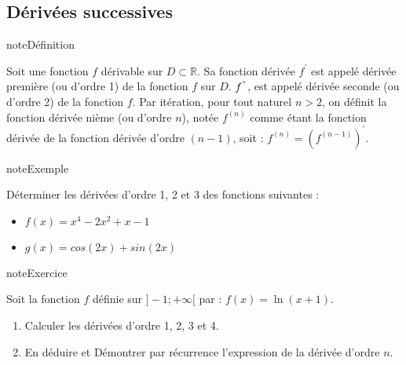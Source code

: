 \documentclass[letterpaper,10pt,french]{jupyterBook}
\begin{document}
\subsection{Dérivées successives}
\label{\detokenize{complements:derivees-successives}}
\begin{sphinxadmonition}{note}{Définition}

\sphinxAtStartPar
Soit une fonction \(f\) dérivable sur \(D \subset \mathbb{R}\). Sa fonction dérivée \(f^{'}\) est appelé dérivée première (ou d’ordre 1) de la fonction \(f\) sur \(D\).
\(f^{"}\), est appelé dérivée seconde (ou d’ordre 2) de la fonction \(f\).
Par itération, pour tout naturel \(n > 2\), on définit la fonction dérivée n\sphinxhyphen{}ième (ou d’ordre \(n\)), notée \(f^{(n)}\) comme étant la fonction dérivée de la fonction dérivée d’ordre \((n − 1)\), soit : \(f^{(n)}= (f^{(n-1)})^{'}\).
\end{sphinxadmonition}

\begin{sphinxadmonition}{note}{Exemple}

\sphinxAtStartPar
Déterminer les dérivées d’ordre 1, 2 et 3 des fonctions suivantes :
\begin{itemize}
\item {} 
\sphinxAtStartPar
\(f(x) = x^4 - 2x^2 + x- 1\)

\item {} 
\sphinxAtStartPar
\(g(x) = cos(2x) + sin(2x)\)

\end{itemize}
\end{sphinxadmonition}

\begin{sphinxadmonition}{note}{Exercice}

\sphinxAtStartPar
Soit la fonction \(f\) définie sur \(] − 1 ; +\infty[\) par : \(f(x) = \ln(x + 1)\).
\begin{enumerate}
%
\item {} 
\sphinxAtStartPar
Calculer les dérivées d’ordre 1, 2, 3 et 4.

\item {} 
\sphinxAtStartPar
En déduire et Démontrer par récurrence l’expression de la dérivée d’ordre \(n\).

\end{enumerate}
\end{sphinxadmonition}
\end{document}
